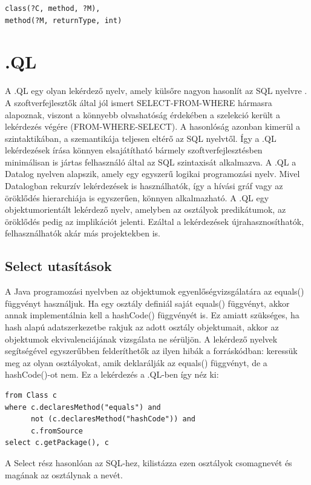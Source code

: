 \documentclass[a4paper,12pt]{report}
\begin{document}
\begin{verbatim}
class(?C, method, ?M),
method(?M, returnType, int)
\end{verbatim}

\section{.QL}
A .QL egy olyan lekérdező nyelv, amely külsőre nagyon hasonlít az SQL nyelvre \cite{dotql}. A szoftverfejlesztők által jól ismert SELECT-FROM-WHERE hármasra alapoznak, viszont a könnyebb olvashatóság érdekében a szelekció került a lekérdezés végére (FROM-WHERE-SELECT). A hasonlóság azonban kimerül a szintaktikában, a szemantikája teljesen eltérő az SQL nyelvtől. Így a .QL lekérdezések írása könnyen elsajátítható bármely szoftverfejlesztésben minimálisan is jártas felhasználó által az SQL szintaxisát alkalmazva. A .QL a Datalog nyelven alapszik, amely egy egyszerű logikai programozási nyelv. Mivel Datalogban rekurzív lekérdezések is használhatók, így a hívási gráf vagy az öröklődés hierarchiája is egyszerűen, könnyen alkalmazható. A .QL egy objektumorientált lekérdező nyelv, amelyben az osztályok predikátumok, az öröklődés pedig az implikációt jelenti. Ezáltal a lekérdezések újrahasznosíthatók, felhasználhatók akár más projektekben is.
\subsection{Select utasítások}
\par A Java programozási nyelvben az objektumok egyenlőségvizsgálatára az equals() függvényt használjuk. Ha egy osztály definiál saját equals() függvényt, akkor annak implementálnia kell a hashCode() függvényét is. Ez amiatt szükséges, ha hash alapú adatszerkezetbe rakjuk az adott osztály objektumait, akkor az objektumok ekvivalenciájának vizsgálata ne sérüljön. A lekérdező nyelvek segítségével egyszerűbben felderíthetők az ilyen hibák a forráskódban: keressük meg az olyan osztályokat, amik deklarálják az equals() függvényt, de a hashCode()-ot nem. Ez a lekérdezés a .QL-ben így néz ki:
\begin{verbatim}
from Class c
where c.declaresMethod("equals") and
      not (c.declaresMethod("hashCode")) and
      c.fromSource
select c.getPackage(), c
\end{verbatim}
A Select rész hasonlóan az SQL-hez, kilistázza ezen osztályok csomagnevét és magának az osztálynak a nevét.
\end{document}
